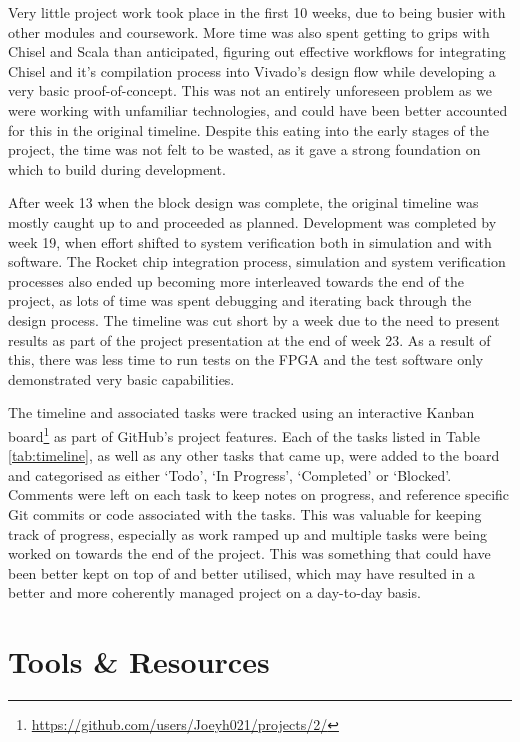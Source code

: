 Very little project work took place in the first 10 weeks, due to being busier with other modules and coursework. More time was also spent getting to grips with Chisel and Scala than anticipated, figuring out effective workflows for integrating Chisel and it's compilation process into Vivado's design flow while developing a very basic proof-of-concept. This was not an entirely unforeseen problem as we were working with unfamiliar technologies, and could have been better accounted for this in the original timeline. Despite this eating into the early stages of the project, the time was not felt to be wasted, as it gave a strong foundation on which to build during development.

After week 13 when the block design was complete, the original timeline was mostly caught up to and proceeded as planned. Development was completed by week 19, when effort shifted to system verification both in simulation and with software. The Rocket chip integration process, simulation and system verification processes also ended up becoming more interleaved towards the end of the project, as lots of time was spent debugging and iterating back through the design process. The timeline was cut short by a week due to the need to present results as part of the project presentation at the end of week 23. As a result of this, there was less time to run tests on the FPGA and the test software only demonstrated very basic capabilities.

The timeline and associated tasks were tracked using an interactive Kanban board\footnote{\url{https://github.com/users/Joeyh021/projects/2/}} as part of GitHub's project features. Each of the tasks listed in Table \ref{tab:timeline}, as well as any other tasks that came up, were added to the board and categorised as either `Todo', `In Progress', `Completed' or `Blocked'. Comments were left on each task to keep notes on progress, and reference specific Git commits or code associated with the tasks. This was valuable for keeping track of progress, especially as work ramped up and multiple tasks were being worked on towards the end of the project. This was something that could have been better kept on top of and better utilised, which may have resulted in a better and more coherently managed project on a day-to-day basis.

\section{Tools \& Resources}

